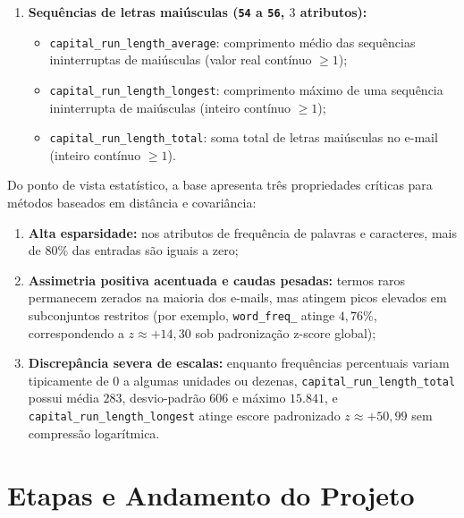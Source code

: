 \documentclass[a4paper,11pt]{article}
\begin{document}
\begin{itemize}[leftmargin=1.5em, itemsep=0.25em, topsep=0.25em]
\begin{enumerate}[leftmargin=1.5em, itemsep=0.25em, topsep=0.25em]
  \item \textbf{Sequências de letras maiúsculas (\texttt{54} a \texttt{56}, $3$ atributos):}
\begin{itemize}[leftmargin=1.5em, itemsep=0.25em, topsep=0.25em]
  \item \texttt{capital\_\allowbreak run\_\allowbreak length\_\allowbreak average}: comprimento médio das sequências ininterruptas de maiúsculas (valor real contínuo $\ge 1$);
  \item \texttt{capital\_\allowbreak run\_\allowbreak length\_\allowbreak longest}: comprimento máximo de uma sequência ininterrupta de maiúsculas (inteiro contínuo $\ge 1$);
  \item \texttt{capital\_\allowbreak run\_\allowbreak length\_\allowbreak total}: soma total de letras maiúsculas no e-mail (inteiro contínuo $\ge 1$).
\end{itemize}
\end{enumerate}
\end{itemize}
Do ponto de vista estatístico, a base apresenta três propriedades críticas para métodos baseados em distância e covariância:
\begin{enumerate}[leftmargin=1.5em, itemsep=0.25em, topsep=0.25em]
  \item \textbf{Alta esparsidade:} nos atributos de frequência de palavras e caracteres, mais de $80\%$ das entradas são iguais a zero;
  \item \textbf{Assimetria positiva acentuada e caudas pesadas:} termos raros permanecem zerados na maioria dos e-mails, mas atingem picos elevados em subconjuntos restritos (por exemplo, \texttt{word\_\allowbreak freq\_} atinge $4,76\%$, correspondendo a $z \approx +14,30$ sob padronização z-score global);
  \item \textbf{Discrepância severa de escalas:} enquanto frequências percentuais variam tipicamente de $0$ a algumas unidades ou dezenas, \texttt{capital\_\allowbreak run\_\allowbreak length\_\allowbreak total} possui média $283$, desvio-padrão $606$ e máximo $15.841$, e \texttt{capital\_\allowbreak run\_\allowbreak length\_\allowbreak longest} atinge escore padronizado $z \approx +50,99$ sem compressão logarítmica.
\end{enumerate}

\section{Etapas e Andamento do Projeto}\label{sec:2-etapas-e-andamento-do-projeto}
\end{document}
